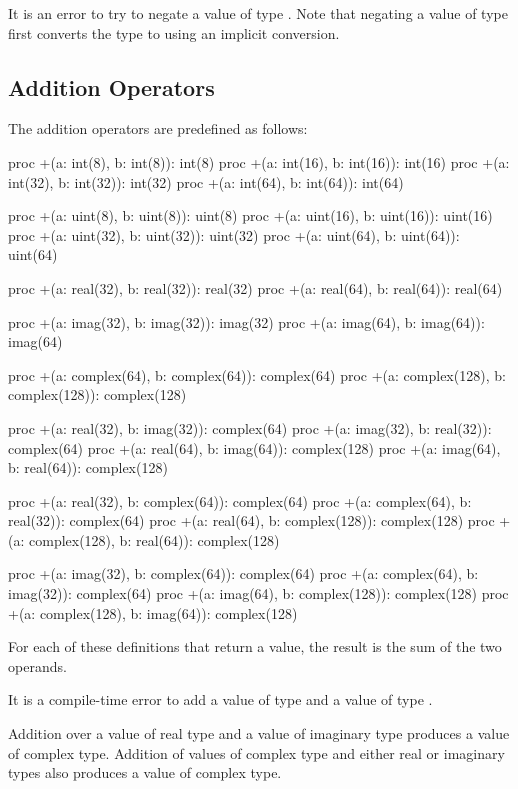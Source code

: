 It is an error to try to negate a value of type .  Note
that negating a value of type  first converts the type
to  using an implicit conversion.

\subsection{Addition Operators}
\label{Addition_Operators}

The addition operators are predefined as follows:
\begin{chapel}
proc +(a: int(8), b: int(8)): int(8)
proc +(a: int(16), b: int(16)): int(16)
proc +(a: int(32), b: int(32)): int(32)
proc +(a: int(64), b: int(64)): int(64)

proc +(a: uint(8), b: uint(8)): uint(8)
proc +(a: uint(16), b: uint(16)): uint(16)
proc +(a: uint(32), b: uint(32)): uint(32)
proc +(a: uint(64), b: uint(64)): uint(64)

proc +(a: real(32), b: real(32)): real(32)
proc +(a: real(64), b: real(64)): real(64)

proc +(a: imag(32), b: imag(32)): imag(32)
proc +(a: imag(64), b: imag(64)): imag(64)

proc +(a: complex(64), b: complex(64)): complex(64)
proc +(a: complex(128), b: complex(128)): complex(128)

proc +(a: real(32), b: imag(32)): complex(64)
proc +(a: imag(32), b: real(32)): complex(64)
proc +(a: real(64), b: imag(64)): complex(128)
proc +(a: imag(64), b: real(64)): complex(128)

proc +(a: real(32), b: complex(64)): complex(64)
proc +(a: complex(64), b: real(32)): complex(64)
proc +(a: real(64), b: complex(128)): complex(128)
proc +(a: complex(128), b: real(64)): complex(128)

proc +(a: imag(32), b: complex(64)): complex(64)
proc +(a: complex(64), b: imag(32)): complex(64)
proc +(a: imag(64), b: complex(128)): complex(128)
proc +(a: complex(128), b: imag(64)): complex(128)
\end{chapel}
For each of these definitions that return a value, the result is the
sum of the two operands.

It is a compile-time error to add a value of type  and
a value of type .

Addition over a value of real type and a value of imaginary type
produces a value of complex type.  Addition of values of complex type
and either real or imaginary types also produces a value of complex
type.

